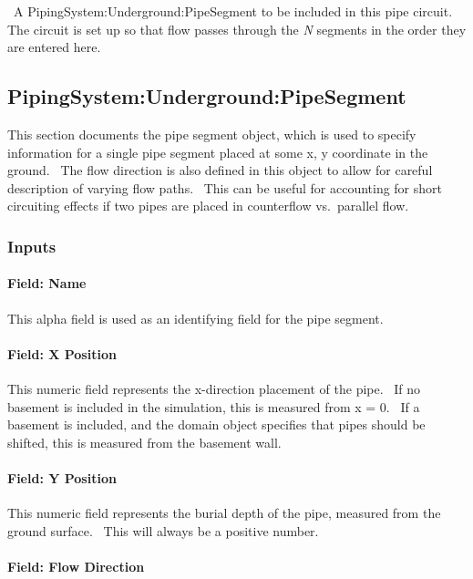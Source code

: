 ~A PipingSystem:Underground:PipeSegment to be included in this pipe circuit.~ The circuit is set up so that flow passes through the \emph{N} segments in the order they are entered here.

\subsection{PipingSystem:Underground:PipeSegment}\label{pipingsystemundergroundpipesegment}

This section documents the pipe segment object, which is used to specify information for a single pipe segment placed at some x, y coordinate in the ground.~ The flow direction is also defined in this object to allow for careful description of varying flow paths.~ This can be useful for accounting for short circuiting effects if two pipes are placed in counterflow vs.~parallel flow.

\subsubsection{Inputs}\label{inputs-11-009}

\paragraph{Field: Name}\label{field-name-11-008}

This alpha field is used as an identifying field for the pipe segment.

\paragraph{Field: X Position}\label{field-x-position}

This numeric field represents the x-direction placement of the pipe.~ If no basement is included in the simulation, this is measured from x = 0.~ If a basement is included, and the domain object specifies that pipes should be shifted, this is measured from the basement wall.

\paragraph{Field: Y Position}\label{field-y-position}

This numeric field represents the burial depth of the pipe, measured from the ground surface.~ This will always be a positive number.

\paragraph{Field: Flow Direction}\label{field-flow-direction}

